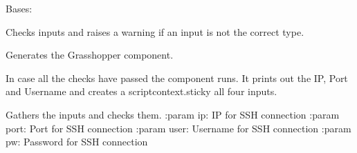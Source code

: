 \documentclass[letterpaper,10pt,english]{sphinxmanual}
\begin{document}

\begin{fulllineitems}
\label{\detokenize{miscellaneous:livestock.components.misc.SSHConnection}}
Bases: {\hyperref[\detokenize{superclass:livestock.components.component.GHComponent}]{}}

\begin{fulllineitems}
\label{\detokenize{miscellaneous:livestock.components.misc.SSHConnection.check_inputs}}
Checks inputs and raises a warning if an input is not the correct type.

\end{fulllineitems}


\begin{fulllineitems}
\label{\detokenize{miscellaneous:livestock.components.misc.SSHConnection.config}}
Generates the Grasshopper component.

\end{fulllineitems}


\begin{fulllineitems}
\label{\detokenize{miscellaneous:livestock.components.misc.SSHConnection.run}}
In case all the checks have passed the component runs.
It prints out the IP, Port and Username and creates a
scriptcontext.sticky all four inputs.

\end{fulllineitems}


\begin{fulllineitems}
\label{\detokenize{miscellaneous:livestock.components.misc.SSHConnection.run_checks}}
Gathers the inputs and checks them.
:param ip: IP for SSH connection
:param port: Port for SSH connection
:param user: Username for SSH connection
:param pw: Password for SSH connection

\end{fulllineitems}


\end{fulllineitems}
\end{document}
